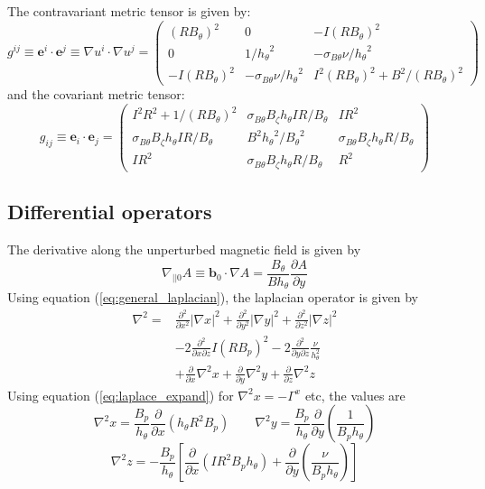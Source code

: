 \documentclass[12pt, a4paper]{article}
\newcommand{\deriv}[2]{\ensuremath{\frac{\partial #1}{\partial #2}}}
\newcommand{\hthe}{\ensuremath{h_\theta}}
\newcommand{\Bp}{\ensuremath{B_\theta}}
\newcommand{\Bt}{\ensuremath{B_\zeta}}
\newcommand{\Vec}[1]{\ensuremath{\mathbf{#1}}}
\newcommand{\rbp}{\ensuremath{R\Bp}}
\newcommand{\rbpsq}{\ensuremath{\left(\rbp\right)^2}}
\newcommand{\sbp}{\ensuremath{\sigma_{B\theta}}}
\begin{document}
The contravariant metric tensor is given by:
\[
g^{ij} \equiv \Vec{e}^i \cdot\Vec{e}^j \equiv \nabla u^i \cdot \nabla u^j = \left(\begin{array}{ccc}
\left(R\Bp\right)^2 & 0 & -I\left(R\Bp\right)^2 \\
0 & 1 / \hthe^2 & -\sbp\nu / \hthe^2 \\
-I\left(R\Bp\right)^2 & -\sbp\nu / \hthe^2 & I^2\left(R\Bp\right)^2 + B^2 / \left(R\Bp\right)^2 \end{array} \right)
\]
and the covariant metric tensor:
\[
g_{ij} \equiv \Vec{e}_i \cdot\Vec{e}_j = \left(\begin{array}{ccc}
I^2 R^2 + 1 / \rbpsq & \sbp\Bt\hthe I R / \Bp & I R^2 \\
\sbp\Bt\hthe I R / \Bp & B^2\hthe^2 / \Bp^2 & \sbp\Bt\hthe R / \Bp \\
I R^2 & \sbp\Bt\hthe R / \Bp & R^2 \end{array} \right)
\]

\subsection{Differential operators}

The derivative along the unperturbed magnetic field is given by
\[
\nabla_{||0}A \equiv \Vec{b}_0 \cdot\nabla A = \frac{\Bp}{B\hthe}\deriv{A}{y}
\]
Using equation (\ref{eq:general_laplacian}), the laplacian operator is given by
\begin{eqnarray}
\nabla^2 = &\frac{\partial^2}{\partial x^2}\left|\nabla x\right|^2 + 
\frac{\partial^2}{\partial y^2}\left|\nabla y\right|^2 + 
\frac{\partial^2}{\partial z^2}\left|\nabla z\right|^2 \nonumber \\
&-2\frac{\partial^2}{\partial x\partial z}I\left(RB_p\right)^2 - 2\frac{\partial^2}{\partial y\partial z}\frac{\nu}{h_\theta^2}\\
&+\frac{\partial}{\partial x}\nabla^2x + \frac{\partial}{\partial y}\nabla^2y + \frac{\partial}{\partial z}\nabla^2z \nonumber
\end{eqnarray}
Using equation (\ref{eq:laplace_expand}) for $\nabla^2x = -\Gamma^x$ etc, the values are
\begin{equation}
\nabla^2x = \frac{B_p}{h_\theta}\frac{\partial}{\partial x}\left(h_\theta R^2B_p\right) \qquad
\nabla^2y = \frac{B_p}{h_\theta}\frac{\partial}{\partial y}\left(\frac{1}{B_ph_\theta}\right)
\end{equation}
\[
\nabla^2z = -\frac{B_p}{h_\theta}\left[\frac{\partial}{\partial x}\left(IR^2B_ph_\theta\right) + \frac{\partial}{\partial y}\left(\frac{\nu}{B_ph_\theta}\right)\right]
\]
\end{document}
